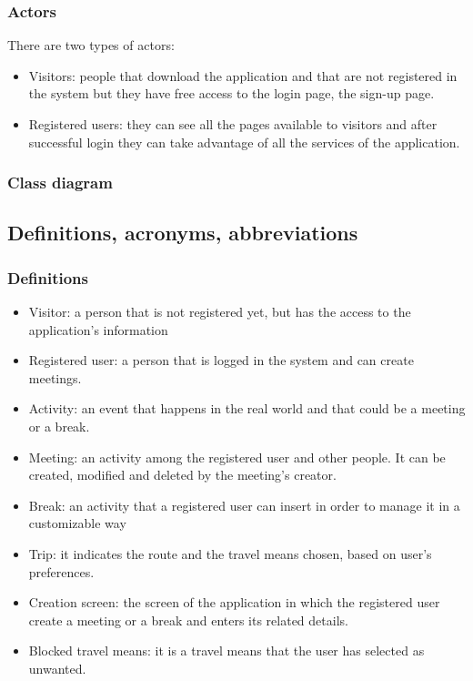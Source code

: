 \documentclass[12pt,titlepage]{article}
\begin{document}
\subsubsection{Actors}\label{RASD}
There are two types of actors:
\begin{itemize}
\item Visitors: people that download the application and that are not registered in the system but they have free access to the login page, the sign-up page.
\item Registered users: they can see all the pages available to visitors and after successful login they can take advantage of all the services of the application.

\end{itemize}

\subsubsection{Class diagram}\label{sec:mod1}

\subsection{Definitions, acronyms, abbreviations}\label{RASD}
\subsubsection{Definitions}\label{RASD}
\begin{itemize}
\item Visitor: a person that is not registered yet, but has the access to the application's information 
\item	Registered user: a person that is logged in the system and can create meetings.
\item	Activity: an event that happens in the real world and that could be a meeting or a break.
\item	Meeting: an activity among the registered user and other people. It can be created, modified and deleted by the meeting's creator. 
\item	Break: an activity that a registered user can insert in order to manage it in a customizable way
\item Trip: it indicates the route and the travel means chosen, based on user's preferences.
\item	Creation screen: the screen of the application in which the registered user create a meeting or a break and enters its related details.
\item Blocked travel means: it is a travel means that the user has selected as unwanted.
\end{itemize}
\end{document}
